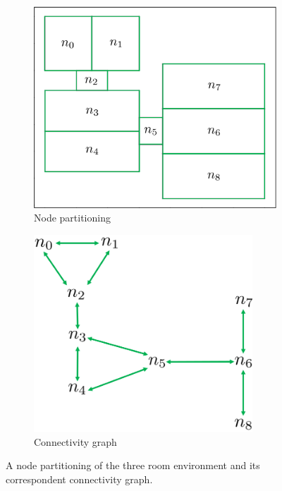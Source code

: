 \begin{figure}
    \centering
    \begin{subfigure}[b]{0.48\textwidth}
        \includegraphics[width=1.0\textwidth]{Report/images/envsmall_l2.png}
        \caption{Node partitioning}
        \label{subfig:nodes}
    \end{subfigure}
    \begin{subfigure}[b]{0.48\textwidth}
    \includegraphics[width=0.9\textwidth]{Report/images/nodeconnectiongraph.png}
        \caption{Connectivity graph}
        \label{subfig:nodeconnection}
    \end{subfigure}
    \caption{A node partitioning of the three room environment and its correspondent connectivity graph.}
    \label{fig:nodes}
\end{figure}
